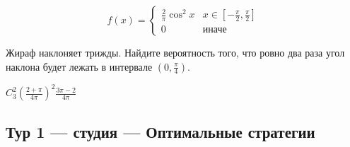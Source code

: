 \begin{enumerate}
\begin{problem}
\[
f(x) = \begin{cases}
\frac{2}{\pi} \cos^2 x & x \in \left[-\frac{\pi}{2}, \frac{\pi}{2}\right] \\
0 & \text{иначе}
\end{cases}
\]

Жираф наклоняет трижды. Найдите вероятность того, что ровно два раза угол наклона будет лежать в интервале $\left(0, \frac{\pi}{4}\right)$.

\begin{sol}
$C_3^2 \left(\frac{2+\pi}{4\pi}\right)^2 \frac{3\pi-2}{4\pi}$
\end{sol}
\end{problem}
\end{enumerate}


\newpage
\subsection{Тур 1 — студия — Оптимальные стратегии}

